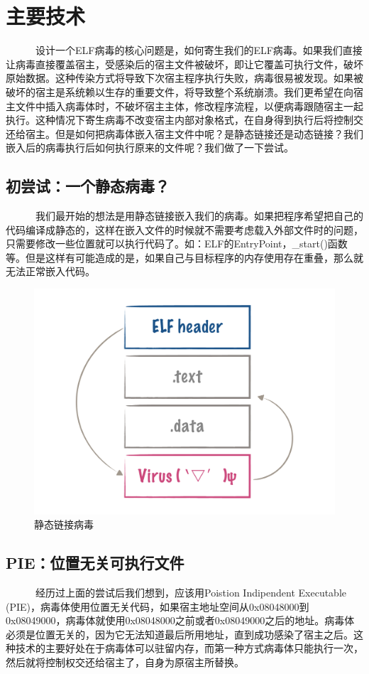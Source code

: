 \documentclass[a4paper, 11pt]{article}
\begin{document}
\newpage
\section{主要技术}
~~~~~~设计一个ELF病毒的核心问题是，如何寄生我们的ELF病毒。如果我们直接让病毒直接覆盖宿主，受感染后的宿主文件被破坏，即让它覆盖可执行文件，破坏原始数据。这种传染方式将导致下次宿主程序执行失败，病毒很易被发现。如果被破坏的宿主是系统赖以生存的重要文件，将导致整个系统崩溃。我们更希望在向宿主文件中插入病毒体时，不破坏宿主主体，修改程序流程，以便病毒跟随宿主一起执行。这种情况下寄生病毒不改变宿主内部对象格式，在自身得到执行后将控制交还给宿主。但是如何把病毒体嵌入宿主文件中呢？是静态链接还是动态链接？我们嵌入后的病毒执行后如何执行原来的文件呢？我们做了一下尝试。
\subsection{初尝试：一个静态病毒？}
~~~~~~我们最开始的想法是用静态链接嵌入我们的病毒。如果把程序希望把自己的代码编译成静态的，这样在嵌入文件的时候就不需要考虑载入外部文件时的问题，只需要修改一些位置就可以执行代码了。如：ELF的EntryPoint，\_start()函数等。但是这样有可能造成的是，如果自己与目标程序的内存使用存在重叠，那么就无法正常嵌入代码。
\vspace{1em}
	\begin{figure}[htbp]
		\centering
		\includegraphics[width = \textwidth]{figures/fig1_order}
		\caption{静态链接病毒}
		\label{fig:way1}
	\end{figure}
\subsection{PIE：位置无关可执行文件}
~~~~~~经历过上面的尝试后我们想到，应该用Poistion Indipendent Executable (PIE)，病毒体使用位置无关代码，如果宿主地址空间从0x08048000到0x08049000，病毒体就使用0x08048000之前或者0x08049000之后的地址。病毒体必须是位置无关的，因为它无法知道最后所用地址，直到成功感染了宿主之后。这种技术的主要好处在于病毒体可以驻留内存，而第一种方式病毒体只能执行一次，然后就将控制权交还给宿主了，自身为原宿主所替换。
\end{document}

